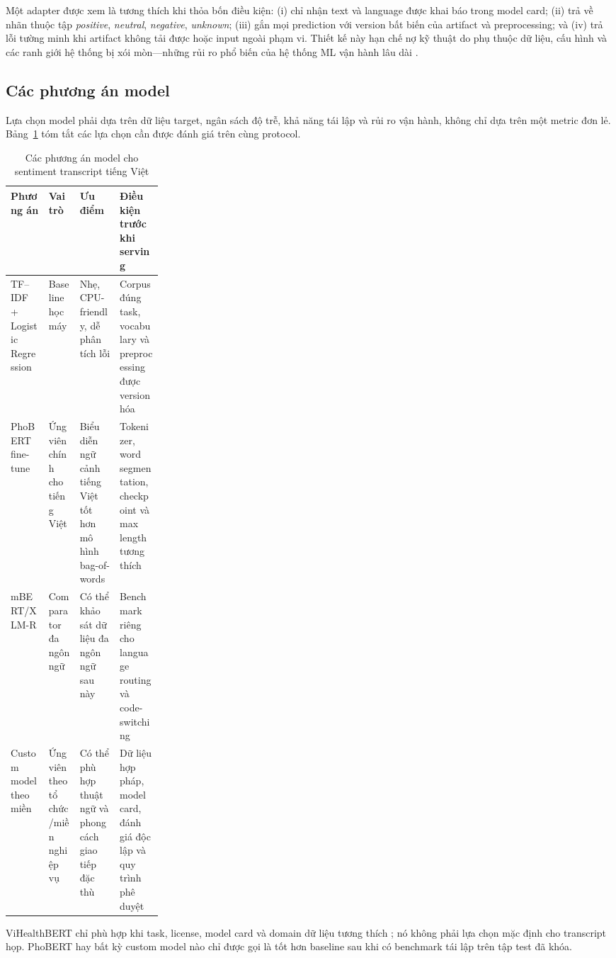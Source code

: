Một adapter được xem là tương thích khi thỏa bốn điều kiện: (i) chỉ nhận text và language được khai báo trong model card; (ii) trả về nhãn thuộc tập \textit{positive}, \textit{neutral}, \textit{negative}, \textit{unknown}; (iii) gắn mọi prediction với version bất biến của artifact và preprocessing; và (iv) trả lỗi tường minh khi artifact không tải được hoặc input ngoài phạm vi. Thiết kế này hạn chế nợ kỹ thuật do phụ thuộc dữ liệu, cấu hình và các ranh giới hệ thống bị xói mòn---những rủi ro phổ biến của hệ thống ML vận hành lâu dài \cite{sculley2015}.

\subsection{Các phương án model}
Lựa chọn model phải dựa trên dữ liệu target, ngân sách độ trễ, khả năng tái lập và rủi ro vận hành, không chỉ dựa trên một metric đơn lẻ. Bảng~\ref{tab:model-options} tóm tắt các lựa chọn cần được đánh giá trên cùng protocol.

\begin{table}[H]
\centering
\caption{Các phương án model cho sentiment transcript tiếng Việt}
\label{tab:model-options}
\begin{tabularx}{\linewidth}{p{0.25\linewidth}XXX}
\toprule
Phương án & Vai trò & Ưu điểm & Điều kiện trước khi serving \\ \midrule
TF--IDF + Logistic Regression & Baseline học máy & Nhẹ, CPU-friendly, dễ phân tích lỗi & Corpus đúng task, vocabulary và preprocessing được version hóa \\
PhoBERT fine-tune & Ứng viên chính cho tiếng Việt & Biểu diễn ngữ cảnh tiếng Việt tốt hơn mô hình bag-of-words & Tokenizer, word segmentation, checkpoint và max length tương thích \cite{phobert2020} \\
mBERT/XLM-R & Comparator đa ngôn ngữ & Có thể khảo sát dữ liệu đa ngôn ngữ sau này & Benchmark riêng cho language routing và code-switching \cite{xlmr2020} \\
Custom model theo miền & Ứng viên theo tổ chức/miền nghiệp vụ & Có thể phù hợp thuật ngữ và phong cách giao tiếp đặc thù & Dữ liệu hợp pháp, model card, đánh giá độc lập và quy trình phê duyệt \\
\bottomrule
\end{tabularx}
\end{table}

ViHealthBERT chỉ phù hợp khi task, license, model card và domain dữ liệu tương thích \cite{vihealthbert2022}; nó không phải lựa chọn mặc định cho transcript họp. PhoBERT hay bất kỳ custom model nào chỉ được gọi là tốt hơn baseline sau khi có benchmark tái lập trên tập test đã khóa.


